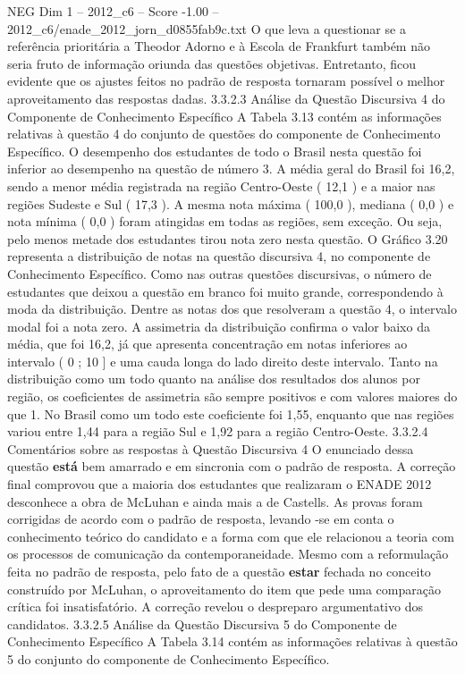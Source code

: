 \begin{textsample}{NEG Dim 1 – 2012\_c6 – Score -1.00 – 2012\_c6/enade\_2012\_jorn\_d0855fab9c.txt}
O que leva a questionar se a referência prioritária a Theodor Adorno e à Escola de Frankfurt também não seria fruto de informação oriunda das questões objetivas.
Entretanto, ficou evidente que os ajustes feitos no padrão de resposta tornaram possível o melhor aproveitamento das respostas dadas. 3.3.2.3 Análise da Questão Discursiva 4 do Componente de Conhecimento Específico A Tabela 3.13 contém as informações relativas à questão 4 do conjunto de questões do componente de Conhecimento Específico.
O desempenho dos estudantes de todo o Brasil nesta questão foi inferior ao desempenho na questão de número 3.
A média geral do Brasil foi 16,2, sendo a menor média registrada na região Centro-Oeste ( 12,1 ) e a maior nas regiões Sudeste e Sul ( 17,3 ).
A mesma nota máxima ( 100,0 ), mediana ( 0,0 ) e nota mínima ( 0,0 ) foram atingidas em todas as regiões, sem exceção.
Ou seja, pelo menos metade dos estudantes tirou nota zero nesta questão.
O Gráfico 3.20 representa a distribuição de notas na questão discursiva 4, no componente de Conhecimento Específico.
Como nas outras questões discursivas, o número de estudantes que deixou a questão em branco foi muito grande, correspondendo à moda da distribuição.
Dentre as notas dos que resolveram a questão 4, o intervalo modal foi a nota zero.
A assimetria da distribuição confirma o valor baixo da média, que foi 16,2, já que apresenta concentração em notas inferiores ao intervalo ( 0 ; 10 ] e uma cauda longa do lado direito deste intervalo.
Tanto na distribuição como um todo quanto na análise dos resultados dos alunos por região, os coeficientes de assimetria são sempre positivos e com valores maiores do que 1.
No Brasil como um todo este coeficiente foi 1,55, enquanto que nas regiões variou entre 1,44 para a região Sul e 1,92 para a região Centro-Oeste. 3.3.2.4 Comentários sobre as respostas à Questão Discursiva 4 O enunciado dessa questão \textbf{está} bem amarrado e em sincronia com o padrão de resposta.
A correção final comprovou que a maioria dos estudantes que realizaram o ENADE 2012 desconhece a obra de McLuhan e ainda mais a de Castells.
As provas foram corrigidas de acordo com o padrão de resposta, levando -se em conta o conhecimento teórico do candidato e a forma com que ele relacionou a teoria com os processos de comunicação da contemporaneidade.
Mesmo com a reformulação feita no padrão de resposta, pelo fato de a questão \textbf{estar} fechada no conceito construído por McLuhan, o aproveitamento do item que pede uma comparação crítica foi insatisfatório.
A correção revelou o despreparo argumentativo dos candidatos. 3.3.2.5 Análise da Questão Discursiva 5 do Componente de Conhecimento Específico A Tabela 3.14 contém as informações relativas à questão 5 do conjunto do componente de Conhecimento Específico.

\end{textsample}
